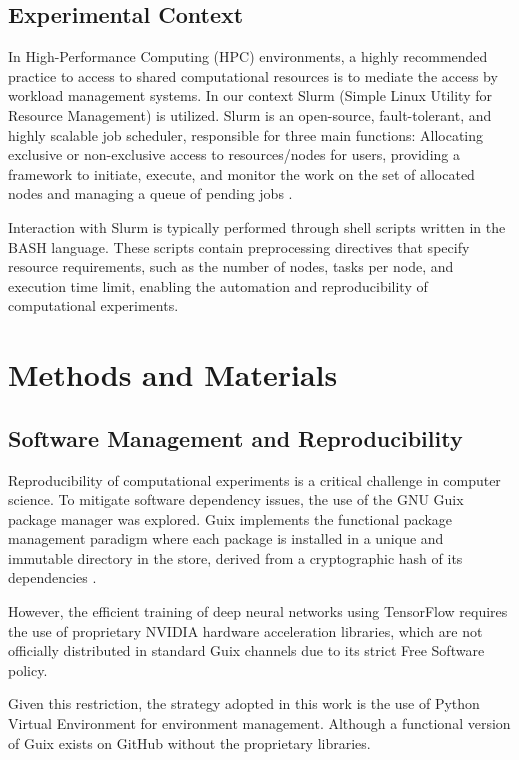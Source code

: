 \documentclass[12pt]{article}
\begin{document}
\subsection{Experimental Context}
\label{sec:org349130c}
In High-Performance Computing (HPC) environments, a highly recommended
practice to access to shared computational resources is to mediate the
access by workload management systems. In our context Slurm (Simple
Linux Utility for Resource Management) is utilized. Slurm is an
open-source, fault-tolerant, and highly scalable job scheduler,
responsible for three main functions: Allocating exclusive or
non-exclusive access to resources/nodes for users, providing a
framework to initiate, execute, and monitor the work on the set of
allocated nodes and managing a queue of pending jobs \cite{yoo2003slurm}.

Interaction with Slurm is typically performed through shell scripts
written in the BASH language. These scripts contain preprocessing
directives that specify resource requirements, such as the number of
nodes, tasks per node, and execution time limit, enabling the
automation and reproducibility of computational experiments.


\section{Methods and Materials}
\label{sec:org6ece505}

\subsection{Software Management and Reproducibility}
\label{sec:org86033e8}

Reproducibility of computational experiments is a critical challenge
in computer science. To mitigate software dependency issues, the use
of the GNU Guix package manager was explored. Guix implements the
functional package management paradigm where each package is
installed in a unique and immutable directory in the store, derived
from a cryptographic hash of its dependencies \cite{courtes2013guix}.

However, the efficient training of deep neural networks using
TensorFlow requires the use of proprietary NVIDIA hardware
acceleration libraries, which are not officially distributed in
standard Guix channels due to its strict Free Software policy.

Given this restriction, the strategy adopted in this work is the use
of Python Virtual Environment for environment management. Although a
functional version of Guix exists on GitHub without the proprietary
libraries.
\end{document}
